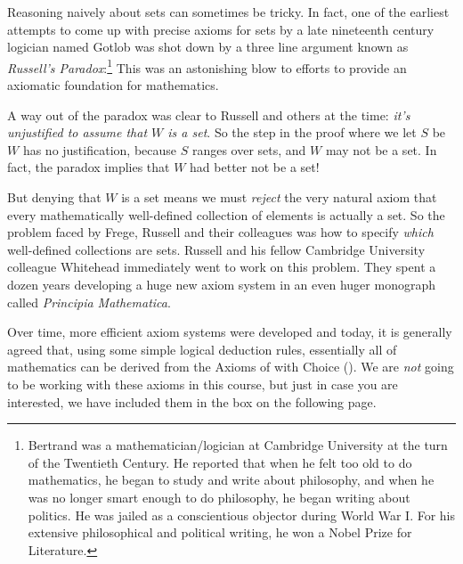 Reasoning naively about sets can sometimes be tricky.  In fact, one of the
earliest attempts to come up with precise axioms for sets by a late
nineteenth century logician named Gotlob  was shot down by a three
line argument known as \emph{Russell's Paradox}:\footnote{Bertrand 
  was a mathematician/logician at Cambridge University at the turn of the
  Twentieth Century.  He reported that when he felt too old to do
  mathematics, he began to study and write about philosophy, and when he
  was no longer smart enough to do philosophy, he began writing about
  politics.  He was jailed as a conscientious objector during World War I.
  For his extensive philosophical and political writing, he won a Nobel
  Prize for Literature.}  This was an astonishing blow to efforts to
provide an axiomatic foundation for mathematics.


A way out of the paradox was clear to Russell and others at the time:
\emph{it's unjustified to assume that $W$ is a set}.  So the step in the
proof where we let $S$ be $W$ has no justification, because $S$ ranges
over sets, and $W$ may not be a set.  In fact, the paradox implies that
$W$ had better not be a set!

But denying that $W$ is a set means we must \emph{reject} the very natural
axiom that every mathematically well-defined collection of elements is
actually a set.  So the problem faced by Frege, Russell and their
colleagues was how to specify \emph{which} well-defined collections are
sets.  Russell and his fellow Cambridge University colleague Whitehead
immediately went to work on this problem.  They spent a dozen years
developing a huge new axiom system in an even huger monograph called
\emph{Principia Mathematica}.

Over time, more efficient axiom systems were developed and today, it is
generally agreed that, using some simple logical deduction rules,
essentially all of mathematics can be derived from
the Axioms of  with Choice ().
We are \emph{not} going to be working with these axioms in this course,
but just in case you are interested, we have included them in the box
on the following page.

